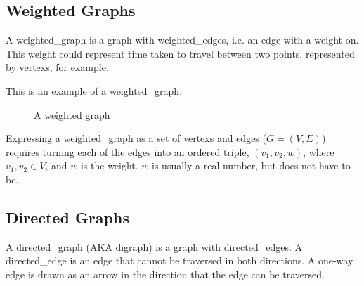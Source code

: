     \subsection{Weighted Graphs}
        A \gls{weighted_graph} is a \gls{graph} with \glspl{weighted_edge}, i.e. an \gls{edge} with a weight on.
        This weight could represent time taken to travel between two points, represented by \glspl{vertex}, for example.

        This is an example of a \gls{weighted_graph}:

        \begin{figure}
            \centering
            \caption{A weighted graph}
            \label{fig:weighted_graph}
        \end{figure}

        Expressing a \gls{weighted_graph} as a set of \glspl{vertex} and \glspl{edge} ($G=(V,E)$) requires turning each of the \glspl{edge} into an ordered triple, $(v_1,v_2,w)$, where $v_1,v_2\in V$, and $w$ is the weight.
        $w$ is usually a real number, but does not have to be.

    \subsection{Directed Graphs}
        A \gls{directed_graph} (AKA digraph) is a \gls{graph} with \glspl{directed_edge}.
        A \gls{directed_edge} is an \gls{edge} that cannot be traversed in both directions.
        A one-way \gls{edge} is drawn as an arrow in the direction that the \gls{edge} can be traversed.

